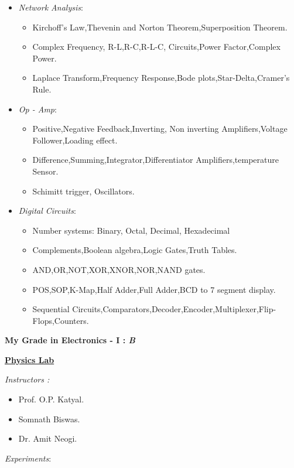 \documentclass{report}
\begin{document}
\begin{itemize}
\item \emph{Network Analysis}:
\begin{itemize}
\item Kirchoff's Law,Thevenin and Norton Theorem,Superposition Theorem.
\item Complex Frequency, R-L,R-C,R-L-C, Circuits,Power Factor,Complex Power.
\item Laplace Transform,Frequency Response,Bode plots,Star-Delta,Cramer's Rule.
\end{itemize}
\item \emph{Op - Amp}:
\begin{itemize}
\item Positive,Negative Feedback,Inverting, Non inverting Amplifiers,Voltage Follower,Loading effect.
\item Difference,Summing,Integrator,Differentiator Amplifiers,temperature Sensor.
\item Schimitt trigger, Oscillators.
\end{itemize}
\item \emph{Digital Circuits}:
\begin{itemize}
\item Number systems: Binary, Octal, Decimal, Hexadecimal
\item Complements,Boolean algebra,Logic Gates,Truth Tables.
\item AND,OR,NOT,XOR,XNOR,NOR,NAND gates.
\item POS,SOP,K-Map,Half Adder,Full Adder,BCD to 7 segment display.
\item Sequential Circuits,Comparators,Decoder,Encoder,Multiplexer,Flip-Flops,Counters.
\end{itemize}
\end{itemize}
\Large{\bf My Grade in Electronics - I : \emph{B}}
\pagebreak
\begin{center}\huge{\bf \underline{Physics Lab}}\end{center}\vspace{.3in}
\large \emph{Instructors :}\vspace{.05in}
\begin{itemize}
\item Prof. O.P. Katyal.
\item Somnath Biswas.
\item Dr. Amit Neogi.
\end{itemize}
\vspace{.1in}
\emph{Experiments}:\vspace{.05in}
\end{document}
